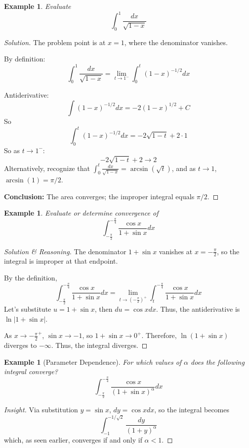 \documentclass[12pt]{article}
\newtheorem{example}[definition]{Example}
\begin{document}
\begin{example}
Evaluate
\[
\int_0^1 \frac{dx}{\sqrt{1 - x}}
\]
\end{example}
\begin{proof}[Solution]
The problem point is at $x=1$, where the denominator vanishes.

By definition:
\[
\int_0^1 \frac{dx}{\sqrt{1-x}} = \lim_{t\to 1^-} \int_0^t (1-x)^{-1/2} dx
\]

Antiderivative:
\[
\int (1 - x)^{-1/2} dx = -2 (1 - x)^{1/2} + C
\]
So
\[
\int_0^t (1 - x)^{-1/2} dx = -2 \sqrt{1-t} + 2 \cdot 1
\]
So as $t \to 1^-$:
\[
-2\sqrt{1-t} + 2 \to 2
\]
Alternatively, recognize that $\int_0^t \frac{dx}{\sqrt{1 - x}} = \arcsin(\sqrt{t})$, and as $t \to 1$, $\arcsin(1)=\pi/2$.

\textbf{Conclusion:} The area converges; the improper integral equals $\pi/2$.
\end{proof}

\begin{example}
Evaluate or determine convergence of
\[
\int_{-\frac{\pi}{2}}^{-\frac{\pi}{4}} \frac{\cos x}{1+\sin x} dx
\]
\end{example}
\begin{proof}[Solution \& Reasoning]
The denominator $1 + \sin x$ vanishes at $x = -\frac{\pi}{2}$, so the integral is improper at that endpoint.

By the definition,
\[
\int_{-\frac{\pi}{2}}^{-\frac{\pi}{4}} \frac{\cos x}{1+\sin x} dx = \lim_{t\to (-\frac{\pi}{2})^+} \int_t^{-\frac{\pi}{4}} \frac{\cos x}{1+\sin x} dx
\]
Let’s substitute $u = 1 + \sin x$, then $du = \cos x dx$. Thus, the antiderivative is $\ln|1+\sin x|$.

As $x \to -\frac{\pi}{2}^+$, $\sin x \to -1$, so $1+\sin x \to 0^+$. Therefore, $\ln(1+\sin x)$ diverges to $-\infty$. Thus, the integral diverges.
\end{proof}

\begin{example}[Parameter Dependence]
For which values of $\alpha$ does the following integral converge?
\[
\int_{-\frac{\pi}{2}}^{-\frac{\pi}{4}} \frac{\cos x}{(1+\sin x)^\alpha} dx
\]
\end{example}
\begin{proof}[Insight]
Via substitution $y = \sin x$, $dy = \cos x dx$, so the integral becomes
\[
\int_{-1}^{-1/\sqrt{2}} \frac{dy}{(1+y)^\alpha}
\]
which, as seen earlier, converges if and only if $\alpha < 1$.
\end{proof}
\end{document}
